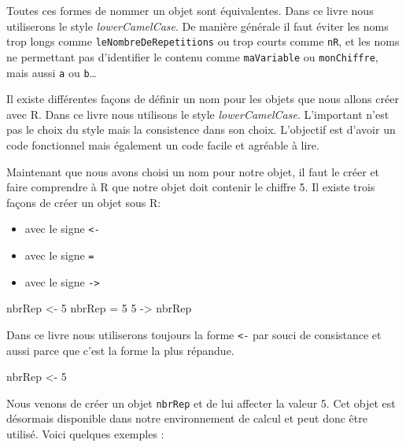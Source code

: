 \documentclass[]{book}
\newenvironment{Shaded}{\begin{snugshade}}{\end{snugshade}}
\newcommand{\DecValTok}[1]{\textcolor[rgb]{0.00,0.00,0.81}{#1}}
\newcommand{\NormalTok}[1]{#1}
\newcommand{\StringTok}[1]{\textcolor[rgb]{0.31,0.60,0.02}{#1}}
\providecommand{\tightlist}{%
  \setlength{\itemsep}{0pt}\setlength{\parskip}{0pt}}
\begin{document}
Toutes ces formes de nommer un objet sont équivalentes. Dans ce livre nous utiliserons le style \emph{lowerCamelCase}. De manière générale il faut éviter les noms trop longs comme \texttt{leNombreDeRepetitions} ou trop courts comme \texttt{nR}, et les noms ne permettant pas d'identifier le contenu comme \texttt{maVariable} ou \texttt{monChiffre}, mais aussi \texttt{a} ou \texttt{b}\ldots{}

Il existe différentes façons de définir un nom pour les objets que nous allons créer avec R. Dans ce livre nous utilisons le style \emph{lowerCamelCase}. L'important n'est pas le choix du style mais la consistence dans son choix. L'objectif est d'avoir un code fonctionnel mais également un code facile et agréable à lire.

Maintenant que nous avons choisi un nom pour notre objet, il faut le créer et faire comprendre à R que notre objet doit contenir le chiffre 5. Il existe trois façons de créer un objet sous R:

\begin{itemize}
\tightlist
\item
  avec le signe \texttt{\textless{}-}
\item
  avec le signe \texttt{=}
\item
  avec le signe \texttt{-\textgreater{}}
\end{itemize}

\begin{Shaded}
\begin{Highlighting}[]
\NormalTok{nbrRep <-}\StringTok{ }\DecValTok{5}
\NormalTok{nbrRep =}\StringTok{ }\DecValTok{5}
\DecValTok{5}\NormalTok{ ->}\StringTok{ }\NormalTok{nbrRep}
\end{Highlighting}
\end{Shaded}

Dans ce livre nous utiliserons toujours la forme \texttt{\textless{}-} par souci de consistance et aussi parce que c'est la forme la plus répandue.

\begin{Shaded}
\begin{Highlighting}[]
\NormalTok{nbrRep <-}\StringTok{ }\DecValTok{5}
\end{Highlighting}
\end{Shaded}

Nous venons de créer un objet \texttt{nbrRep} et de lui affecter la valeur 5. Cet objet est désormais disponible dans notre environnement de calcul et peut donc être utilisé. Voici quelques exemples :
\end{document}

